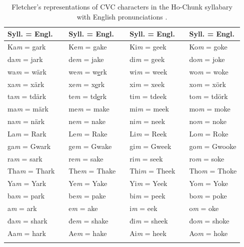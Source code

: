 \documentclass[output=paper]{LSP/langsci}
\begin{document}
\begin{table}
\begin{tabular}{lllllll}
\lsptoprule
Syll. = Engl. && Syll. = Engl. && Syll. = Engl. && Syll. = Engl.\\
\midrule
Ka\emph{m} = gark && Ke\emph{m} = gake && Ki\emph{m} = geek && Ko\emph{m} = goke\\
da\emph{m} = jark && de\emph{m} = jake && di\emph{m} = geek && do\emph{m} = joke\\
wa\emph{m} = wärk && we\emph{m} = w\underline{e}rk && wi\emph{m} = week && wo\emph{m} = woke\\
xa\emph{m} = xärk && xe\emph{m} = x\underline{e}rk && xi\emph{m} = xeek && xo\emph{m} = xörk\\
ta\emph{m} = tdärk && te\emph{m} = td\underline{e}rk && ti\emph{m} = tdeek && to\emph{m} = tdörk\\
ma\emph{m} = märk && me\emph{m} = make && mi\emph{m} = meek && mo\emph{m} = moke\\
na\emph{m} = närk && ne\emph{m} = nake && ni\emph{m} = neek && no\emph{m} = noke\\
La\emph{m} = Rark && Le\emph{m} = Rake && Li\emph{m} = Reek && Lo\emph{m} = Roke\\
ga\emph{m} = Gwark && ge\emph{m} = Gwake && gi\emph{m} = Gweek && go\emph{m} = Gwooke\\
ra\emph{m} = sark && re\emph{m} = sake && ri\emph{m} = seek && ro\emph{m} = soke\\
Tha\emph{m} = Thark && The\emph{m} = Thake && Thi\emph{m} = Theek && Tho\emph{m} = Thoke\\
Ya\emph{m} = Yark && Ye\emph{m} = Yake && Yi\emph{m} = Yeek && Yo\emph{m} = Yoke\\
ba\emph{m} = park && be\emph{m} = pake && bi\emph{m} = peek && bo\emph{m} = poke\\
a\emph{m} = ark && e\emph{m} = ake && i\emph{m} = eek && o\emph{m} = oke\\
đa\emph{m} = shark && đe\emph{m} = shake && đi\emph{m} = sheek && đo\emph{m} = shoke\\
Aa\emph{m} = hark && Ae\emph{m} = hake && Ai\emph{m} = heek && Ao\emph{m} = hoke\\
\lspbottomrule
\end{tabular}
\caption{Fletcher's representations of CVC characters in the Ho-Chunk syllabary with English pronunciations \citep[adapted from][300]{Fletcher1890a}.}
\label{fletchercvc}
\end{table}
\end{document}
